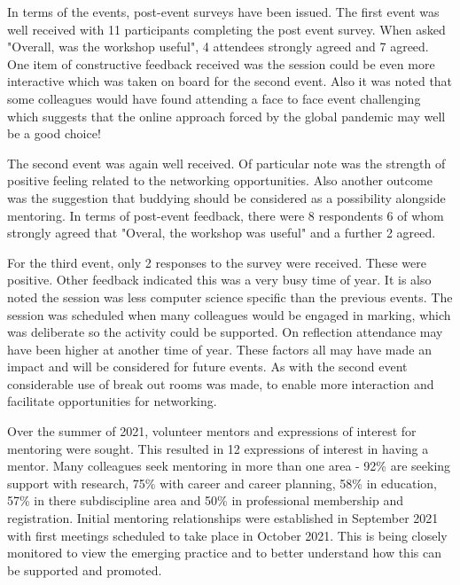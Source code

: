 \documentclass[sigconf]{acmart}
\begin{document}
In terms of the events, post-event surveys have been issued. The first event was well received with 11 participants completing the post event survey. When asked "Overall, was the workshop useful", 4 attendees strongly agreed and 7 agreed. One item of constructive feedback received was the session could be even more interactive which was taken on board for the second event. Also it was noted that some colleagues would have found attending a face to face event challenging which suggests that the online approach forced by the global pandemic may well be a good choice!

The second event was again well received. Of particular note was the strength of positive feeling related to the networking opportunities. Also another outcome was the suggestion that buddying should be considered as a possibility alongside mentoring. In terms of post-event feedback, there were 8 respondents 6 of whom strongly agreed that "Overal, the workshop was useful" and a further 2 agreed.

For the third event, only 2 responses to the survey were received. These were positive. Other feedback indicated this was a very busy time of year. It is also noted the session was less computer science specific than the previous events. The session was scheduled when many colleagues would be engaged in marking, which was deliberate so the activity could be supported. On reflection attendance may have been higher at another time of year. These factors all may have made an impact and will be considered for future events. As with the second event considerable use of break out rooms was made, to enable more interaction and facilitate opportunities for networking. 

\begin{comment}
TO DO - evaluation of Mentoring - PH what is needed here? Is sufficient to indicate the first pilot of 10 Mentees has been established? Or do we need feedback from the participants?
\end{comment}

Over the summer of 2021, volunteer mentors and expressions of interest for mentoring were sought. This resulted in 12 expressions of interest in having a mentor. Many colleagues seek mentoring in more than one area - 92\% are seeking support with research, 75\% with career and career planning, 58\% in education, 57\% in there subdiscipline area and 50\% in professional membership and registration. Initial mentoring relationships were established in September 2021 with first meetings scheduled to take place in October 2021. This is being closely monitored to view the emerging practice and to better understand how this can be supported and promoted.
\end{document}
